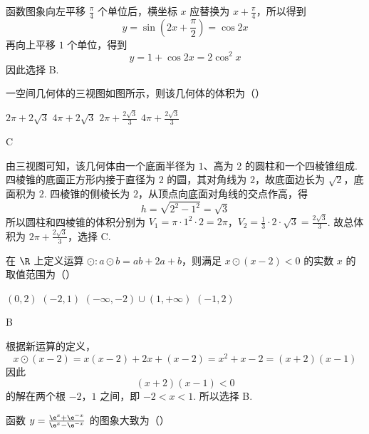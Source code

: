 \begin{solution}
函数图象向左平移 \(\frac\pi4\) 个单位后，横坐标 \(x\) 应替换为 \(x+\frac\pi4\)，所以得到
\[
y=\sin\left(2x+\frac\pi2\right)=\cos2x
\]
再向上平移 \(1\) 个单位，得到
\[
y=1+\cos2x=2\cos^2x
\]
因此选择 B.
\end{solution}

\begin{problem}
一空间几何体的三视图如图所示，则该几何体的体积为（\quad）


\choices
    {\(2\pi + 2\sqrt{3}\)}
    {\(4\pi + 2\sqrt{3}\)}
    {\(2\pi + \frac{2\sqrt{3}}{3}\)}
    {\(4\pi + \frac{2\sqrt{3}}{3}\)}
\end{problem}

\begin{answer}
C
\end{answer}

\begin{solution}
由三视图可知，该几何体由一个底面半径为 \(1\)、高为 \(2\) 的圆柱和一个四棱锥组成. 四棱锥的底面正方形内接于直径为 \(2\) 的圆，其对角线为 \(2\)，故底面边长为 \(\sqrt2\)，底面积为 \(2\). 四棱锥的侧棱长为 \(2\)，从顶点向底面对角线的交点作高，得
\[
h=\sqrt{2^2-1^2}=\sqrt3
\]
所以圆柱和四棱锥的体积分别为
\(V_1=\pi\cdot1^2\cdot2=2\pi\)，\(V_2=\frac13\cdot2\cdot\sqrt3=\frac{2\sqrt3}{3}\).
故总体积为 \(2\pi+\frac{2\sqrt3}{3}\)，选择 C.
\end{solution}

\begin{problem}
在 \(\R\) 上定义运算 \(\odot: a \odot b = ab + 2a + b\)，则满足 \(x \odot (x - 2) < 0\) 的实数 \(x\) 的取值范围为（\quad）

\choices
    {\((0,2)\)}
    {\((-2,1)\)}
    {\((- \infty, -2) \cup (1, +\infty)\)}
    {\((-1, 2)\)}
\end{problem}

\begin{answer}
B
\end{answer}

\begin{solution}
根据新运算的定义，
\[
x\odot(x-2)=x(x-2)+2x+(x-2)=x^2+x-2=(x+2)(x-1)
\]
因此
\[
(x+2)(x-1)<0
\]
的解在两个根 \(-2\)，\(1\) 之间，即 \(-2<x<1\). 所以选择 B.
\end{solution}

\begin{problem}
函数 \( y = \frac{\e^x + \e^{-x}}{\e^x - \e^{-x}} \) 的图象大致为（\quad）

    {}
    {}
    {}
\end{problem}

